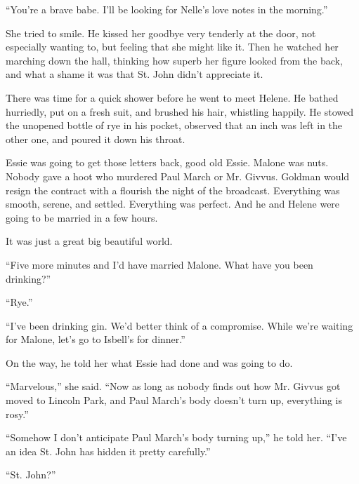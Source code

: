 \documentclass{novel}
\begin{document}
“You’re a brave babe. I'll be looking for Nelle’s love notes in the morning.”

She tried to smile. He kissed her goodbye very tenderly at the door, not especially wanting to, but feeling that she might like it. Then he watched her marching down the hall, thinking how superb her figure looked from the back, and what a shame it was that St. John didn’t appreciate it.

There was time for a quick shower before he went to meet Helene. He bathed hurriedly, put on a fresh suit, and brushed his hair, whistling happily. He stowed the unopened bottle of rye in his pocket, observed that an inch was left in the other one, and poured it down his throat.

Essie was going to get those letters back, good old Essie. Malone was nuts. Nobody gave a hoot who murdered Paul March or Mr. Givvus. Goldman would resign the contract with a flourish the night of the broadcast. Everything was smooth, serene, and settled. Everything was perfect. And he and Helene were going to be married in a few hours.

It was just a great big beautiful world.

\begin{ChapterStart}
\vspace{3\nbs}
\end{ChapterStart}

“Five more minutes and I’d have married Malone. What have you been drinking?”

“Rye.”

“I’ve been drinking gin. We’d better think of a compromise. While we’re waiting for Malone, let’s go to Isbell’s for dinner.”

On the way, he told her what Essie had done and was going to do.

“Marvelous,” she said. “Now as long as nobody finds out how Mr. Givvus got moved to Lincoln Park, and Paul March’s body doesn’t turn up, everything is rosy.”

“Somehow I don’t anticipate Paul March’s body turning up,” he told her. “I’ve an idea St. John has hidden it pretty carefully.”

“St. John?”
\end{document}

